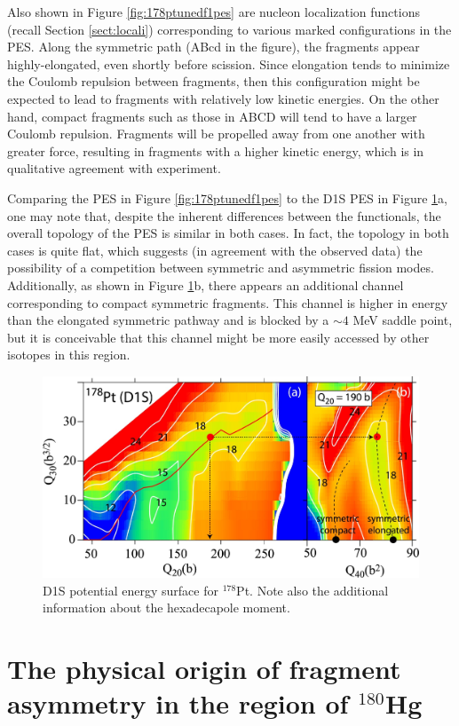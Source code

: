 Also shown in Figure \ref{fig:178ptunedf1pes} are nucleon localization functions (recall Section \ref{sect:locali}) corresponding to various marked configurations in the PES. Along the symmetric path (ABcd in the figure), the fragments appear highly-elongated, even shortly before scission. Since elongation tends to minimize the Coulomb repulsion between fragments, then this configuration might be expected to lead to fragments with relatively low kinetic energies. On the other hand, compact fragments such as those in ABCD will tend to have a larger Coulomb repulsion. Fragments will be propelled away from one another with greater force, resulting in fragments with a higher kinetic energy, which is in qualitative agreement with experiment.

Comparing the {\hfb} PES in Figure \ref{fig:178ptunedf1pes} to the D1S PES in Figure \ref{fig:178ptd1spes}a, one may note that, despite the inherent differences between the functionals, the overall topology of the PES is similar in both cases. In fact, the topology in both cases is quite flat, which suggests (in agreement with the observed data) the possibility of a competition between symmetric and asymmetric fission modes. Additionally, as shown in Figure \ref{fig:178ptd1spes}b, there appears an additional channel corresponding to compact symmetric fragments. This channel is higher in energy than the elongated symmetric pathway and is blocked by a $\sim4$ MeV saddle point, but it is conceivable that this channel might be more easily accessed by other isotopes in this region.

\begin{figure}
	\centering
	\includegraphics[width=0.7\linewidth]{TeX_files/178Pt_D1S_pes.jpg}
	\caption[D1S potential energy surface for $^{178}$Pt]{D1S potential energy surface for $^{178}$Pt. Note also the additional information about the hexadecapole moment.}
	\label{fig:178ptd1spes}
\end{figure}



\section{The physical origin of fragment asymmetry in the region of $^{180}$Hg}

